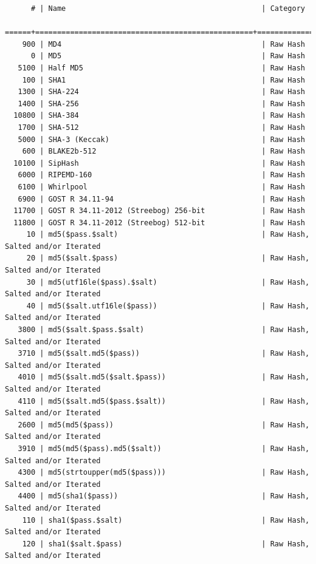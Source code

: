 \documentclass{article}
\begin{document}
\begin{lstlisting}
      # | Name                                             | Category
  ======+==================================================+======================================
    900 | MD4                                              | Raw Hash
      0 | MD5                                              | Raw Hash
   5100 | Half MD5                                         | Raw Hash
    100 | SHA1                                             | Raw Hash
   1300 | SHA-224                                          | Raw Hash
   1400 | SHA-256                                          | Raw Hash
  10800 | SHA-384                                          | Raw Hash
   1700 | SHA-512                                          | Raw Hash
   5000 | SHA-3 (Keccak)                                   | Raw Hash
    600 | BLAKE2b-512                                      | Raw Hash
  10100 | SipHash                                          | Raw Hash
   6000 | RIPEMD-160                                       | Raw Hash
   6100 | Whirlpool                                        | Raw Hash
   6900 | GOST R 34.11-94                                  | Raw Hash
  11700 | GOST R 34.11-2012 (Streebog) 256-bit             | Raw Hash
  11800 | GOST R 34.11-2012 (Streebog) 512-bit             | Raw Hash
     10 | md5($pass.$salt)                                 | Raw Hash, Salted and/or Iterated
     20 | md5($salt.$pass)                                 | Raw Hash, Salted and/or Iterated
     30 | md5(utf16le($pass).$salt)                        | Raw Hash, Salted and/or Iterated
     40 | md5($salt.utf16le($pass))                        | Raw Hash, Salted and/or Iterated
   3800 | md5($salt.$pass.$salt)                           | Raw Hash, Salted and/or Iterated
   3710 | md5($salt.md5($pass))                            | Raw Hash, Salted and/or Iterated
   4010 | md5($salt.md5($salt.$pass))                      | Raw Hash, Salted and/or Iterated
   4110 | md5($salt.md5($pass.$salt))                      | Raw Hash, Salted and/or Iterated
   2600 | md5(md5($pass))                                  | Raw Hash, Salted and/or Iterated
   3910 | md5(md5($pass).md5($salt))                       | Raw Hash, Salted and/or Iterated
   4300 | md5(strtoupper(md5($pass)))                      | Raw Hash, Salted and/or Iterated
   4400 | md5(sha1($pass))                                 | Raw Hash, Salted and/or Iterated
    110 | sha1($pass.$salt)                                | Raw Hash, Salted and/or Iterated
    120 | sha1($salt.$pass)                                | Raw Hash, Salted and/or Iterated

\end{lstlisting}
\end{document}
